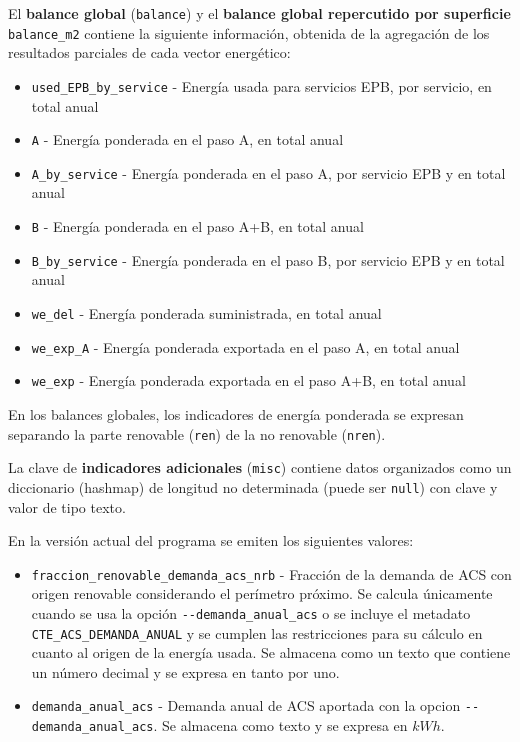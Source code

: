 \documentclass[10pt,notitlepage,oneside,a4paper]{article}
\begin{document}
El \textbf{balance global} (\texttt{balance}) y el \textbf{balance global repercutido por superficie} \texttt{balance\_m2} contiene la siguiente información, obtenida de la agregación de los resultados parciales de cada vector energético:

\begin{itemize}
    \item \texttt{used\_EPB\_by\_service} - Energía usada para servicios EPB, por servicio, en total anual
    \item \texttt{A} - Energía ponderada en el paso A, en total anual
    \item \texttt{A\_by\_service} - Energía ponderada en el paso A, por servicio EPB y en total anual
    \item \texttt{B} - Energía ponderada en el paso A+B, en total anual
    \item \texttt{B\_by\_service} - Energía ponderada en el paso B, por servicio EPB y en total anual
    \item \texttt{we\_del} - Energía ponderada suministrada, en total anual
    \item \texttt{we\_exp\_A} - Energía ponderada exportada en el paso A, en total anual
    \item \texttt{we\_exp} - Energía ponderada exportada en el paso A+B, en total anual
\end{itemize}

En los balances globales, los indicadores de energía ponderada se expresan separando la parte renovable (\texttt{ren}) de la no renovable (\texttt{nren}).

La clave de \textbf{indicadores adicionales} (\texttt{misc}) contiene datos organizados como un diccionario (hashmap) de longitud no determinada (puede ser \texttt{null}) con clave y valor de tipo texto.

En la versión actual del programa se emiten los siguientes valores:

\begin{itemize}
    \item \texttt{fraccion\_renovable\_demanda\_acs\_nrb} - Fracción de la demanda de ACS con origen renovable considerando el perímetro próximo. Se calcula únicamente cuando se usa la opción \texttt{-{}-demanda\_anual\_acs} o se incluye el metadato \texttt{CTE\_ACS\_DEMANDA\_ANUAL} y se cumplen las restricciones para su cálculo en cuanto al origen de la energía usada. Se almacena como un texto que contiene un número decimal y se expresa en tanto por uno.
    \item \texttt{demanda\_anual\_acs} - Demanda anual de ACS aportada con la opcion \texttt{-{}-demanda\_anual\_acs}. Se almacena como texto y se expresa en $kWh$.
\end{itemize}
\end{document}
